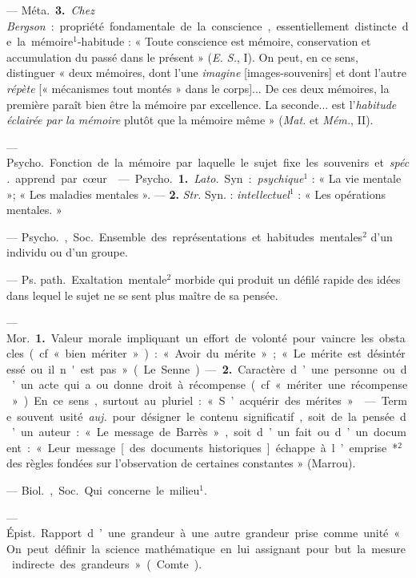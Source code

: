 \begin{itemize}[leftmargin=1cm, label=, itemsep=1pt]
— \si{Méta.} {\bf 3.} {\it Chez Bergson} : propriété fondamentale de la
conscience, essentiellement distincte de la mémoire$^1$-habitude : « Toute
conscience est mémoire, conservation et accumulation du passé dans le
présent » ({\it E. S.}, I). On peut, en ce sens, distinguer « deux mémoires,
dont l’une {\it imagine} [images-souvenirs] et dont l’autre {\it répète}
[« mécanismes tout montés » dans le corps]... De ces deux mémoires, la
première paraît bien être la mémoire par excellence. La seconde... est
l'{\it habitude éclairée par la mémoire} plutôt que la mémoire même »
({\it Mat.} et {\it Mém.}, II).

 — \si{Psycho.} Fonction de la mémoire par
laquelle le sujet fixe les souvenirs et {\it spéc.} apprend par cœur.

 — \si{Psycho.} {\bf 1.} {\it Lato.} Syn. : {\it psychique}$^1$ :
« La vie mentale »; « Les maladies mentales ». — {\bf 2.} {\it Str.} Syn. :
{\it intellectuel}$^1$ : « Les opérations mentales. »

 — \si{Psycho.}, \si{Soc.} Ensemble des représentations et
habitudes mentales$^2$ d’un individu ou d’un groupe.

 — \si{Ps. path.} Exaltation mentale$^2$ morbide qui produit un
défilé rapide des idées dans lequel le sujet ne se sent plus maître de sa
pensée.

 — \si{Mor.} {\bf 1.} Valeur morale impliquant un effort de
volonté pour vaincre les obstacles (cf. « bien mériter ») : « Avoir du
mérite » ; « Le mérite est désintéressé ou il n'est pas » (Le Senne). —
{\bf 2.} Caractère d’une personne ou d’un acte qui a ou donne droit à
récompense (cf. « mériter une récompense »). En ce sens, surtout au pluriel :
« S’acquérir des mérites ».

 — Terme souvent usité {\it auj.} pour désigner le contenu
significatif, soit de la pensée d’un auteur : « Le message de Barrès », soit
d’un fait ou d’un document : « Leur message [des documents historiques]
échappe à l’emprise*$^2$ des règles fondées sur l'observation de certaines
constantes » (Marrou).

 — \si{Biol.}, \si{Soc.} Qui concerne le milieu$^1$.

 — \si{Épist.} Rapport d’une grandeur à une autre grandeur prise
comme unité « On peut définir la science mathématique en lui assignant pour
but la mesure indirecte des grandeurs » (Comte).


\end{itemize}
